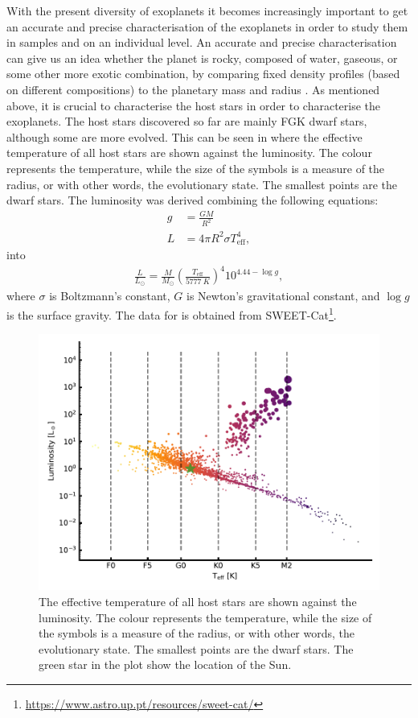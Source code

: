 With the present diversity of exoplanets it becomes increasingly important to get an accurate and
precise characterisation of the exoplanets in order to study them in samples and on an individual
level. An accurate and precise characterisation can give us an idea whether the planet is rocky,
composed of water, gaseous, or some other more exotic combination, by comparing fixed density
profiles (based on different compositions) to the planetary mass and radius
\citep[see][e.g.]{Dorn2015}. As mentioned above, it is crucial to characterise the host stars in
order to characterise the exoplanets. The host stars discovered so far are mainly FGK dwarf stars,
although some are more evolved. This can be seen in  where the effective
temperature of all host stars are shown against the luminosity. The colour represents the
temperature, while the size of the symbols is a measure of the radius, or with other words, the
evolutionary state. The smallest points are the dwarf stars. The luminosity was derived combining
the following equations:
\begin{align*}
  g &= \frac{GM}{R^2} \\
  L &= 4\pi R^2 \sigma T_\mathrm{eff}^4,
\end{align*}
into
\begin{align}
  \frac{L}{L_\odot} = \frac{M}{M_\odot} \left(\frac{T_\mathrm{eff}}{\SI{5777}{K}}\right)^4 10^{4.44-\log g},
\end{align}
where $\sigma$ is Boltzmann's constant, $G$ is Newton's gravitational constant, and $\log g$ is the
surface gravity. The data for  is obtained from SWEET-Cat\footnote{
\url{https://www.astro.up.pt/resources/sweet-cat/}}.

\begin{figure}[htpb!]
    \centering
    \includegraphics[width=1.0\linewidth]{figures/hostDistribution.pdf}
    \caption{The effective temperature of all host stars are shown against the luminosity. The
             colour represents the temperature, while the size of the symbols is a measure of the
             radius, or with other words, the evolutionary state. The smallest points are the dwarf
             stars. The green star in the plot show the location of the Sun.}
    \label{fig:hostDistribution}
\end{figure}


